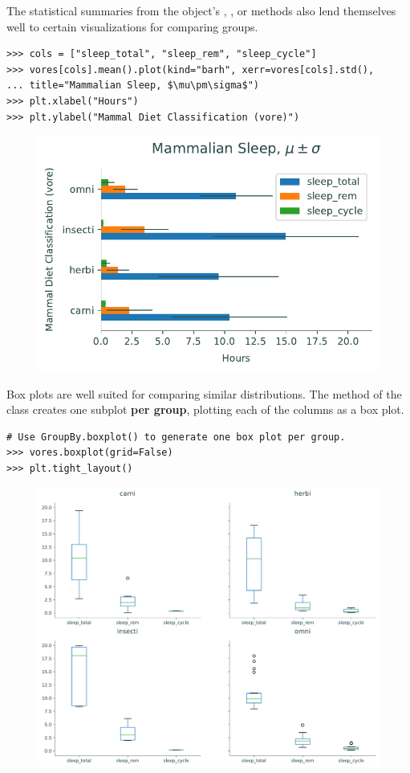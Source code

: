 The statistical summaries from the  object's , , or  methods also lend themselves well to certain visualizations for comparing groups.

\begin{lstlisting}
>>> cols = ["sleep_total", "sleep_rem", "sleep_cycle"]
>>> vores[cols].mean().plot(kind="barh", xerr=vores[cols].std(),
... title="Mammalian Sleep, $\mu\pm\sigma$")
>>> plt.xlabel("Hours")
>>> plt.ylabel("Mammal Diet Classification (vore)")
\end{lstlisting}

\begin{figure}[H]
    \centering
    \includegraphics[width=.7\textwidth]{figures/mammal_bar.pdf}
\end{figure}

Box plots are well suited for comparing similar distributions.
The  method of the  class creates one subplot \textbf{per group}, plotting each of the columns as a box plot.

\begin{lstlisting}
# Use GroupBy.boxplot() to generate one box plot per group.
>>> vores.boxplot(grid=False)
>>> plt.tight_layout()
\end{lstlisting}

\begin{figure}[H]
    \centering
    \includegraphics[width=.7\textwidth]{figures/mammal_box_groups.pdf}
\end{figure}

